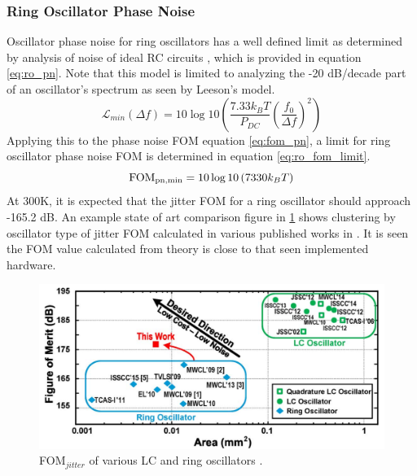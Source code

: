 	\subsubsection{Ring Oscillator Phase Noise}\label{sec:ro_pn_limit}
	Oscillator phase noise for ring oscillators has a well defined limit as determined by analysis of noise of ideal RC circuits \cite{Navid2005}, which is provided in equation \ref{eq:ro_pn}. Note that this model is limited to analyzing the -20 dB/decade part of an oscillator's spectrum as seen by Leeson's model. 
	\begin{equation}\label{eq:ro_pn}
		\mathcal{L}_{min}(\Delta f)= 10\log 10\left(\frac{7.33k_BT}{P_{DC}}\left(\frac{f_0}{\Delta f}\right)^2\right)
	\end{equation}
	Applying this to the phase noise FOM equation \ref{eq:fom_pn}, a limit for ring oscillator phase noise FOM is determined in equation \ref{eq:ro_fom_limit}.
	\begin{equation}\label{eq:ro_fom_limit}
		\textnormal{FOM}_{\textnormal{pn,min}} = 10\log 10\left(7330k_BT\right)
	\end{equation}
	At 300K, it is expected that the jitter FOM for a ring oscillator should approach -165.2 dB. An example state of art comparison figure in \ref{fig:lc_ro_fom} shows clustering by oscillator type of jitter FOM calculated in various published works in \cite{Tohidian2015}. It is seen the FOM value calculated from theory is close to that seen implemented hardware.
	\begin{figure}[htb!]
		\center\includegraphics[width=1\textwidth, angle=0]{./figs/lc_ro_fom_comparison}
		\caption{FOM$_{jitter}$ of various LC and ring oscillators \cite{Tohidian2015}.}
		\label{fig:lc_ro_fom}
	\end{figure}

	\FloatBarrier



